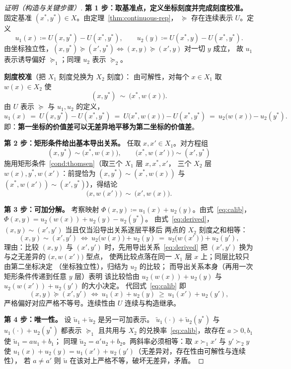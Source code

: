 \begin{proof}[证明（构造与关键步骤）]
\textbf{第 1 步：取基准点，定义坐标刻度并完成刻度校准。}
固定基准 $(x^*,y^*)\in X$。由定理~\ref{thm:continuous-rep}，
$\succeq$ 存在连续表示 $U$。定义
\[
u_1(x)\coloneqq U(x,y^*)-U(x^*,y^*),\qquad
u_2(y)\coloneqq U(x^*,y)-U(x^*,y^*).
\]
由坐标独立性，$(x,y^*)\succeq(x',y^*)\iff(x,y)\succeq(x',y)$ 对一切 $y$ 成立，
故 $u_1$ 表示诱导偏好 $\succeq_1$；同理 $u_2$ 表示 $\succeq_2$。

\textbf{刻度校准}（把 $X_1$ 刻度兑换为 $X_2$ 刻度）：
由可解性，对每个 $x\in X_1$ 取 $w(x)\in X_2$ 使
\[
(x,y^*)\ \sim\ \bigl(x^*,w(x)\bigr).
\]
由 $U$ 表示 $\succeq$ 与 $u_1,u_2$ 的定义，
\begin{equation}\label{eq:calib}
u_1(x)\ =\ U(x,y^*)-U(x^*,y^*)\ =\ U\bigl(x^*,w(x)\bigr)-U(x^*,y^*)\ =\ u_2\bigl(w(x)\bigr)-u_2(y^*).
\end{equation}
即：\textbf{第一坐标的价值差可以无差异地平移为第二坐标的价值差}。

\textbf{第 2 步：矩形条件给出基本导出关系。}
任取 $x,x'\in X_1$。对方程组
\[
(x,y^*)\sim\bigl(x^*,w(x)\bigr),\qquad
\bigl(x^*,w(x')\bigr)\sim(x',y^*)
\]
施用矩形条件~\ref{cond:thomsen}（取三个 $X_1$ 层 $x,x^*,x'$，
三个 $X_2$ 层 $w(x),y^*,w(x')$：前提恰为
$(x,y^*)\sim(x^*,w(x))$ 与 $(x^*,w(x'))\sim(x',y^*)$），得结论
\begin{equation}\label{eq:derived}
\bigl(x,w(x')\bigr)\ \sim\ \bigl(x',w(x)\bigr).
\end{equation}

\textbf{第 3 步：可加分解。}
考察映射 $\Phi(x,y)\coloneqq u_1(x)+u_2(y)$。由式~\eqref{eq:calib}，
$\Phi(x,y)=u_2(w(x))+u_2(y)-u_2(y^*)$。
由式~\eqref{eq:derived}，$(x,y)\sim(x',y')$ 当且仅当沿导出关系逐层平移后
两点的 $X_2$ 刻度之和相等：
\[
(x,y)\sim(x',y')
\ \Longleftrightarrow\
u_2\bigl(w(x)\bigr)+u_2(y)\ =\ u_2\bigl(w(x')\bigr)+u_2(y'),
\]
理由：比较 $(x,y)$ 与 $(x',y')$ 时，先用导出关系~\eqref{eq:derived}
把 $(x',y')$ 换为与之无差异的 $\bigl(x,w(x')\bigr)$ 型点，
使两比较点落在同一 $X_1$ 层 $x$ 上；同层比较只由第二坐标决定
（坐标独立性），归结为 $u_2$ 的比较；
而导出关系本身（再用一次矩形条件传递到任意 $y$ 层）表明
该比较恰由 $u_2(w(x))+u_2(y)$ 与 $u_2(w(x'))+u_2(y')$ 的大小决定。
代回式~\eqref{eq:calib} 即
\[
(x,y)\succeq(x',y')\ \Longleftrightarrow\ u_1(x)+u_2(y)\ \ge\ u_1(x')+u_2(y'),
\]
严格偏好对应严格不等号。连续性由 $U$ 连续与构造继承。

\textbf{第 4 步：唯一性。}
设 $\tilde u_1+\tilde u_2$ 是另一可加表示。
$\tilde u_1(\cdot)+\tilde u_2(y^*)$ 与 $u_1(\cdot)+u_2(y^*)$ 都表示 $\succeq_1$
且共用与 $X_2$ 的兑换率~\eqref{eq:calib}，故存在 $a>0,b_1$ 使 $\tilde u_1=a u_1+b_1$；
同理 $\tilde u_2=a' u_2+b_2$。两斜率必须相等：取 $x\succ_1 x'$ 与 $y'\succ_2 y$ 使
$u_1(x)+u_2(y)=u_1(x')+u_2(y')$（无差异对，存在性由可解性与连续性），
若 $a\ne a'$ 则 $\tilde u$ 在该对上严格不等，破坏无差异，矛盾。
\end{proof}

